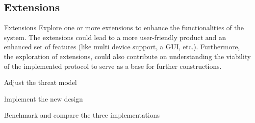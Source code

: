 \documentclass[E]{BAMASA}
\begin{document}
\subsection{Extensions}

\begin{workpackage}{Extensions}\label{wp:extension}
	Explore one or more extensions to enhance the functionalities of the system. The extensions could lead to a more user-friendly product and an enhanced set of features (like multi device support, a GUI, etc.). Furthermore, the exploration of extensions, could also contribute on understanding the viability of the implemented protocol to serve as a base for further constructions.
\end{workpackage}

\begin{workpackage}{Adjust the threat model}\label{wp:adjusted-thread-model}
    
\end{workpackage}

\begin{workpackage}{Implement the new design}\label{wp:new-design}
    
\end{workpackage}

\begin{workpackage}{Benchmark and compare the three implementations}\label{wp:new-implementation}
    
\end{workpackage}


\gradingMA





\end{document}
